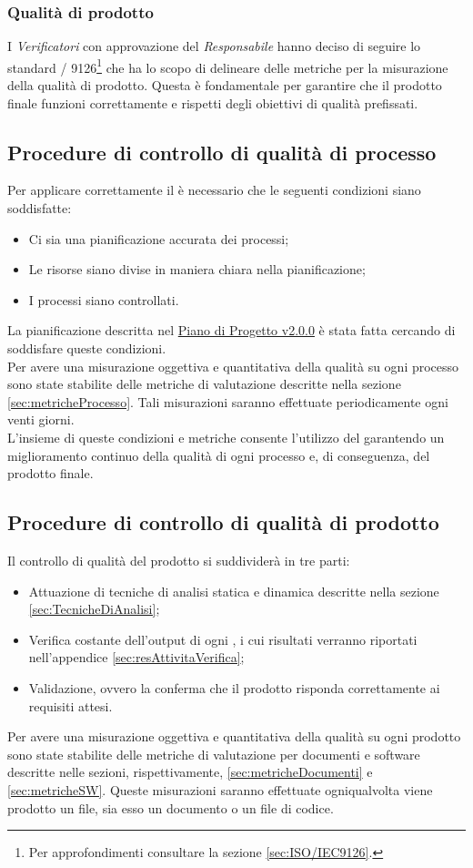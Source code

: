 \documentclass{scalatekids-article}
\begin{document}
\subsubsection{Qualità di prodotto}
I \textit{Verificatori} con approvazione del \textit{Responsabile} hanno deciso di seguire lo standard / 9126\footnote[3]{Per approfondimenti consultare la sezione \ref{sec:ISO/IEC9126}.} che ha lo scopo di delineare delle metriche per la misurazione della qualità di prodotto. Questa è fondamentale per garantire che il prodotto  finale funzioni correttamente e rispetti degli obiettivi di qualità prefissati.
\subsection{Procedure di controllo di qualità di processo}
Per applicare correttamente il  è necessario che le seguenti condizioni siano soddisfatte:
\begin{itemize}
\item{Ci sia una pianificazione accurata dei processi;}
\item{Le risorse siano divise in maniera chiara nella pianificazione;}
\item{I processi siano controllati.}
\end{itemize}
La pianificazione descritta nel \href{run:./PianoDiProgetto\_v2.0.0.pdf}{Piano di Progetto v2.0.0} è stata fatta cercando di soddisfare queste condizioni.\\
Per avere una misurazione oggettiva e quantitativa della qualità su ogni processo sono state stabilite delle metriche di valutazione descritte nella sezione \ref{sec:metricheProcesso}. Tali misurazioni saranno effettuate periodicamente ogni venti giorni.\\
L'insieme di queste condizioni e metriche consente l'utilizzo del  garantendo un miglioramento continuo della qualità di ogni processo e, di conseguenza, del prodotto finale.
\subsection{Procedure di controllo di qualità di prodotto}
Il controllo di qualità del prodotto si suddividerà in tre parti:
\begin{itemize}
\item{Attuazione di tecniche di analisi statica e dinamica descritte nella sezione \ref{sec:TecnicheDiAnalisi};}
\item{Verifica costante dell'output di ogni , i cui risultati verranno riportati nell'appendice \ref{sec:resAttivitaVerifica};}
\item{Validazione, ovvero la conferma che il prodotto risponda correttamente ai requisiti attesi.}
\end{itemize}
Per avere una misurazione oggettiva e quantitativa della qualità su ogni prodotto sono state stabilite delle metriche di valutazione per documenti e software descritte nelle sezioni, rispettivamente, \ref{sec:metricheDocumenti} e \ref{sec:metricheSW}. Queste misurazioni saranno effettuate ogniqualvolta viene prodotto un file, sia esso un documento o un file di codice.\\
\end{document}
